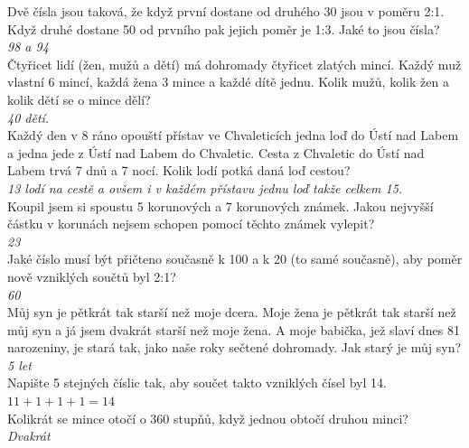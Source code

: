 \begin{multicols}{\value{columnsgames}}
\noindent
Dvě čísla jsou taková, že když první dostane od druhého 30 jsou
v poměru 2:1. Když druhé dostane 50 od prvního pak jejich poměr
je 1:3. Jaké to jsou čísla?\\[1 mm]
{\sl 98 a 94}\\

\noindent
Čtyřicet lidí (žen, mužů a dětí) má dohromady čtyřicet zlatých 
mincí. Každý muž vlastní 6 mincí, každá žena 3 mince a každé dítě jednu. 
Kolik mužů, kolik žen a kolik dětí se o mince dělí?\\[1 mm]
{\sl 40 dětí.}\\

\noindent
Každý den v 8 ráno opouští přístav ve Chvaleticích jedna 
loď do Ústí nad Labem a jedna jede z Ústí nad Labem do Chvaletic. 
Cesta z Chvaletic do Ústí nad Labem trvá 7 dnů a 7 nocí. Kolik 
lodí potká daná loď cestou?\\[1 mm]
{\sl 13 lodí na cestě a ovšem i v každém přístavu jednu loď takže
celkem 15.}\\

\noindent
Koupil jsem si spoustu 5 korunových a 7 korunových známek. 
Jakou nejvyšší částku v korunách nejsem schopen pomocí těchto 
známek vylepit?\\[1 mm]
{\sl 23}\\

\noindent
Jaké číslo musí být přičteno současně k 100 a k 20 (to samé 
současně), aby poměr nově vzniklých součtů byl 2:1?\\[1 mm]
{\sl 60}\\

\noindent
Můj syn je pětkrát tak starší než moje dcera. Moje žena je 
pětkrát tak starší než můj syn a já jsem dvakrát starší než moje 
žena. A moje babička, jež slaví dnes 81 narozeniny, je stará 
tak, jako naše roky sečtené dohromady. Jak starý je můj syn?\\[1 mm]
{\sl 5 let}\\

\noindent
Napište 5 stejných číslic tak, aby součet takto vzniklých 
čísel byl 14.\\[1 mm]
{\sl $11+1+1+1=14$}\\

\noindent
Kolikrát se mince otočí o 360 stupňů, když jednou obtočí 
druhou minci?\\[1 mm]
{\sl Dvakrát}\\


\end{multicols}
